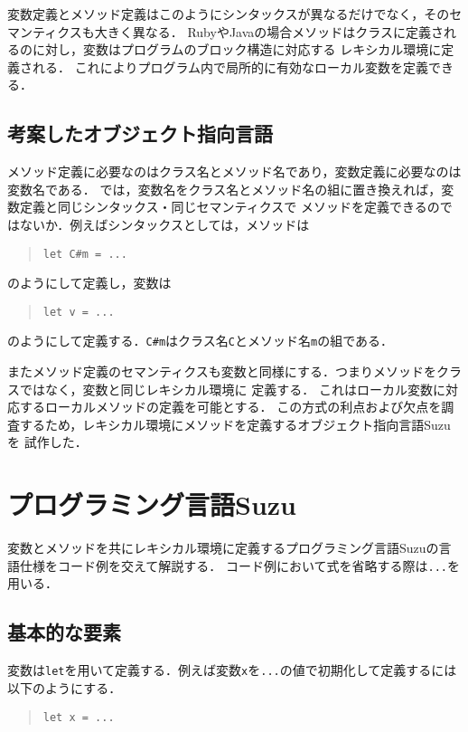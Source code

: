 \documentclass[a4paper,11pt,dvipdfmx]{jreport}
\begin{document}
変数定義とメソッド定義はこのようにシンタックスが異なるだけでなく，そのセマンティクスも大きく異なる．
RubyやJavaの場合メソッドはクラスに定義されるのに対し，変数はプログラムのブロック構造に対応する
レキシカル環境に定義される．
これによりプログラム内で局所的に有効なローカル変数を定義できる．

\section{考案したオブジェクト指向言語}

メソッド定義に必要なのはクラス名とメソッド名であり，変数定義に必要なのは変数名である．
では，変数名をクラス名とメソッド名の組に置き換えれば，変数定義と同じシンタックス・同じセマンティクスで
メソッドを定義できるのではないか．例えばシンタックスとしては，メソッドは
\begin{quote}
\begin{verbatim}
let C#m = ...
\end{verbatim}
\end{quote}
のようにして定義し，変数は
\begin{quote}
\begin{verbatim}
let v = ...
\end{verbatim}
\end{quote}
のようにして定義する．\verb|C#m|はクラス名\verb|C|とメソッド名\verb|m|の組である．

またメソッド定義のセマンティクスも変数と同様にする．つまりメソッドをクラスではなく，変数と同じレキシカル環境に
定義する．
これはローカル変数に対応するローカルメソッドの定義を可能とする．
この方式の利点および欠点を調査するため，レキシカル環境にメソッドを定義するオブジェクト指向言語Suzuを
試作した．


\chapter{プログラミング言語Suzu}
\label{chapter:implementation}

変数とメソッドを共にレキシカル環境に定義するプログラミング言語Suzuの言語仕様をコード例を交えて解説する．
コード例において式を省略する際は\verb|...|を用いる．

\section{基本的な要素}

変数は\verb|let|を用いて定義する．例えば変数\verb|x|を\verb|...|の値で初期化して定義するには
以下のようにする．
\begin{quote}
\begin{verbatim}
let x = ...
\end{verbatim}
\end{quote}
\end{document}
